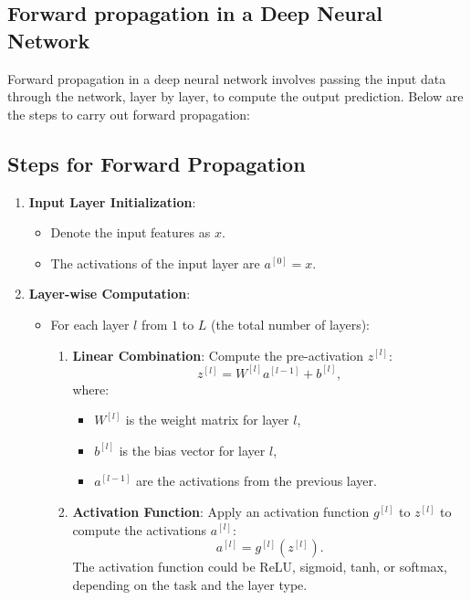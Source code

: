 \documentclass[letterpaper,12pt,notitlepage,twoside]{report}
\begin{document}
\subsection{Forward propagation in a Deep Neural Network}
Forward propagation in a deep neural network involves passing the input data through the network, layer by layer, to compute the output prediction. Below are the steps to carry out forward propagation:

\newpage
\subsection*{Steps for Forward Propagation}

\begin{enumerate}
    \item \textbf{Input Layer Initialization}:
    \begin{itemize}
        \item Denote the input features as \( x \).
        \item The activations of the input layer are \( a^{[0]} = x \).
    \end{itemize}

    \item \textbf{Layer-wise Computation}: 
	\begin{itemize}
		\item For each layer \( l \) from \( 1 \) to \( L \) (the total number of layers):
		\begin{enumerate}
	        \item \textbf{Linear Combination}: Compute the pre-activation \( z^{[l]} \):
	        \[
	        z^{[l]} = W^{[l]} a^{[l-1]} + b^{[l]},
	        \]
	        where:
	        \begin{itemize}
	            \item \( W^{[l]} \) is the weight matrix for layer \( l \),
	            \item \( b^{[l]} \) is the bias vector for layer \( l \),
	            \item \( a^{[l-1]} \) are the activations from the previous layer.
	        \end{itemize}
	
	        \item \textbf{Activation Function}: Apply an activation function \( g^{[l]} \) to \( z^{[l]} \) to compute the activations \( a^{[l]} \):
	        \[
	        a^{[l]} = g^{[l]}(z^{[l]}).
	        \]
	        The activation function could be ReLU, sigmoid, tanh, or softmax, depending on the task and the layer type.
	   	 \end{enumerate}
	\end{itemize}
    

\end{enumerate}
\end{document}
